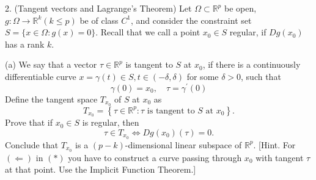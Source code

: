 \newpage

2. (Tangent vectors and Lagrange's Theorem)
Let $\Omega \subset \mathbb{R}^p$ be open, $g: \Omega \rightarrow \mathbb{R}^k(k \leq p)$ be of class $C^1$, and consider the constraint set $S=\{x \in \Omega: g(x)=0\}$. Recall that we call a point $x_0 \in S$ regular, if $D g\left(x_0\right)$ has a rank $k$.

(a) We say that a vector $\tau \in \mathbb{R}^p$ is tangent to $S$ at $x_0$, if there is a continuously differentiable curve $x=\gamma(t) \in S, t \in(-\delta, \delta)$ for some $\delta>0$, such that
\[
\gamma(0)=x_0, \quad \tau=\gamma^{\prime}(0)
\]
Define the tangent space $T_{x_0}$ of $S$ at $x_0$ as
\[
T_{x_0}=\left\{\tau \in \mathbb{R}^p: \tau \text { is tangent to } S \text { at } x_0\right\} .
\]
Prove that if $x_0 \in S$ is regular, then
\[
\tau \in T_{x_0} \Longleftrightarrow D g\left(x_0\right)(\tau)=0 .
\]
Conclude that $T_{x_0}$ is a $(p-k)$-dimensional linear subspace of $\mathbb{R}^p$.
[Hint. For $(\Leftarrow)$ in $(*)$ you have to construct a curve passing through $x_0$ with tangent $\tau$ at that point. Use the Implicit Function Theorem.]
